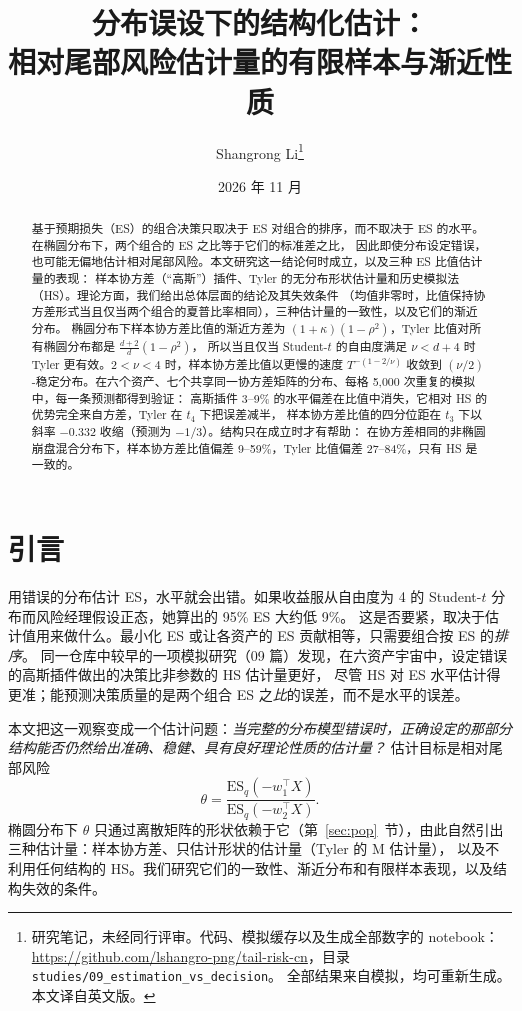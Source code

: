 \documentclass[11pt,UTF8]{ctexart}
\title{分布误设下的结构化估计：\\
\large 相对尾部风险估计量的有限样本与渐近性质}
\author{Shangrong Li\thanks{研究笔记，未经同行评审。代码、模拟缓存以及生成全部数字的 notebook：
\url{https://github.com/lshangro-png/tail-risk-cn}，目录 \texttt{studies/09\_estimation\_vs\_decision}。
全部结果来自模拟，均可重新生成。本文译自英文版。}}
\date{2026 年 11 月}
\newcommand{\ES}{\mathrm{ES}}
\begin{document}
\maketitle

\begin{abstract}
\noindent
基于预期损失（ES）的组合决策只取决于 ES 对组合的排序，而不取决于 ES 的水平。在椭圆分布下，两个组合的 ES 之比等于它们的标准差之比，
因此即使分布设定错误，也可能无偏地估计相对尾部风险。本文研究这一结论何时成立，以及三种 ES 比值估计量的表现：
样本协方差（``高斯''）插件、Tyler 的无分布形状估计量和历史模拟法（HS）。理论方面，我们给出总体层面的结论及其失效条件
（均值非零时，比值保持协方差形式当且仅当两个组合的夏普比率相同），三种估计量的一致性，以及它们的渐近分布。
椭圆分布下样本协方差比值的渐近方差为 $(1+\kappa)(1-\rho^2)$，Tyler 比值对所有椭圆分布都是 $\frac{d+2}{d}(1-\rho^2)$，
所以当且仅当 Student-$t$ 的自由度满足 $\nu<d+4$ 时 Tyler 更有效。$2<\nu<4$ 时，样本协方差比值以更慢的速度 $T^{-(1-2/\nu)}$
收敛到 $(\nu/2)$-稳定分布。在六个资产、七个共享同一协方差矩阵的分布、每格 5{,}000 次重复的模拟中，每一条预测都得到验证：
高斯插件 3--9\% 的水平偏差在比值中消失，它相对 HS 的优势完全来自方差，Tyler 在 $t_4$ 下把误差减半，
样本协方差比值的四分位距在 $t_3$ 下以斜率 $-0.332$ 收缩（预测为 $-1/3$）。结构只在成立时才有帮助：
在协方差相同的非椭圆崩盘混合分布下，样本协方差比值偏差 9--59\%，Tyler 比值偏差 27--84\%，只有 HS 是一致的。
\end{abstract}

\section{引言}

用错误的分布估计 ES，水平就会出错。如果收益服从自由度为 4 的 Student-$t$ 分布而风险经理假设正态，她算出的 95\% ES 大约低 9\%。
这是否要紧，取决于估计值用来做什么。最小化 ES 或让各资产的 ES 贡献相等，只需要组合按 ES 的\emph{排序}。
同一仓库中较早的一项模拟研究（09 篇）发现，在六资产宇宙中，设定错误的高斯插件做出的决策比非参数的 HS 估计量更好，
尽管 HS 对 ES 水平估计得更准；能预测决策质量的是两个组合 ES 之\emph{比}的误差，而不是水平的误差。

本文把这一观察变成一个估计问题：\emph{当完整的分布模型错误时，正确设定的那部分结构能否仍然给出准确、稳健、具有良好理论性质的估计量？}
估计目标是相对尾部风险
\[
\theta=\frac{\ES_q(-w_1^\top X)}{\ES_q(-w_2^\top X)} .
\]
椭圆分布下 $\theta$ 只通过离散矩阵的形状依赖于它（第~\ref{sec:pop}~节），由此自然引出三种估计量：样本协方差、只估计形状的估计量（Tyler 的 M 估计量），
以及不利用任何结构的 HS。我们研究它们的一致性、渐近分布和有限样本表现，以及结构失效的条件。
\end{document}
